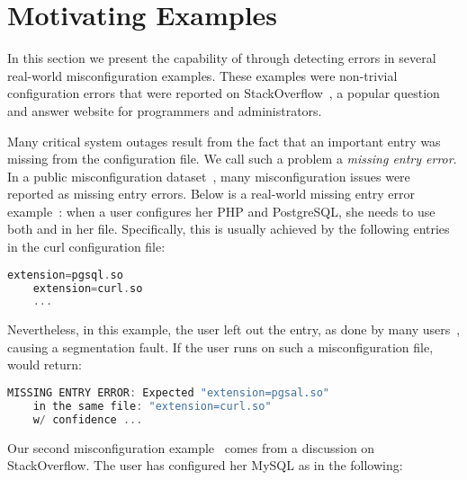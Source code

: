 \section{Motivating Examples}
\label{sec-motiv}

In this section we present the capability of \app through 
detecting errors in several real-world misconfiguration examples. 
These examples were non-trivial configuration errors
that were reported on StackOverflow~\cite{stackoverflow},
a popular question and answer website for programmers and administrators. 

Many critical system outages result from the fact that an important
entry was missing from the configuration file. 
We call such a problem a {\em missing entry error}.
In a public misconfiguration 
dataset~\cite{configdataset}, many misconfiguration issues were 
reported as missing entry errors.
Below is a real-world missing entry error example~\cite{missingentry}:
when a user configures her PHP and PostgreSQL,
she needs to use both  and 
in her  file.
Specifically, this is usually
achieved by the following entries in 
the curl configuration file:

\begin{lstlisting}[language=C, xleftmargin=.01\textwidth]
    extension=pgsql.so
    extension=curl.so
    ...
\end{lstlisting} 

Nevertheless, in this example, the user 
left out the  entry, 
as done by many users~\cite{yin11anempirical, missingentry}, 
causing a segmentation fault. 
If the user runs \app on such a misconfiguration file,
\app would return:

\begin{lstlisting}[language=C, xleftmargin=.01\textwidth]
    MISSING ENTRY ERROR: Expected "extension=pgsal.so"
    in the same file: "extension=curl.so"
    w/ confidence ...
\end{lstlisting} 

\label{ex:fine}
Our second misconfiguration example~\cite{correlation} 
comes from a discussion on StackOverflow.
The user has configured her MySQL as in the following:

